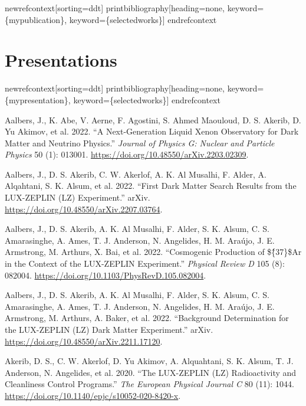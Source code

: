 \documentclass[
  10pt,
  letterpaper,
  DIV=11,
  numbers=noendperiod]{scrartcl}
\newlength{\cslhangindent}
\newlength{\cslentryspacingunit} %
\newenvironment{CSLReferences}[2] %
 {%
  \setlength{\parindent}{0pt}
  \ifodd #1
  \let\oldpar\par
  \def\par{\hangindent=\cslhangindent\oldpar}
  \fi
  \setlength{\parskip}{#2\cslentryspacingunit}
 }%
 {}
\begin{document}
newrefcontext{[}sorting=ddt{]} printbibliography{[}heading=none,
keyword=\{mypublication\}, keyword=\{selectedworks\}{]} endrefcontext

\hypertarget{fa-chart-bar-presentations}{%
\section{\texorpdfstring{
Presentations}{ Presentations}}\label{fa-chart-bar-presentations}}

newrefcontext{[}sorting=ddt{]} printbibliography{[}heading=none,
keyword=\{mypresentation\}, keyword=\{selectedworks\}{]} endrefcontext

\hypertarget{refs}{}
\begin{CSLReferences}{1}{0}
\leavevmode{}%
Aalbers, J., K. Abe, V. Aerne, F. Agostini, S. Ahmed Maouloud, D. S.
Akerib, D. Yu Akimov, et al. 2022. {``A {Next-Generation Liquid Xenon
Observatory} for {Dark Matter} and {Neutrino Physics}.''} \emph{Journal
of Physics G: Nuclear and Particle Physics} 50 (1): 013001.
\url{https://doi.org/10.48550/arXiv.2203.02309}.

\leavevmode{}%
Aalbers, J., D. S. Akerib, C. W. Akerlof, A. K. Al Musalhi, F. Alder, A.
Alqahtani, S. K. Alsum, et al. 2022. {``First {Dark Matter Search
Results} from the {LUX-ZEPLIN} ({LZ}) {Experiment}.''} {arXiv}.
\url{https://doi.org/10.48550/arXiv.2207.03764}.

\leavevmode{}%
Aalbers, J., D. S. Akerib, A. K. Al Musalhi, F. Alder, S. K. Alsum, C.
S. Amarasinghe, A. Ames, T. J. Anderson, N. Angelides, H. M. Araújo, J.
E. Armstrong, M. Arthurs, X. Bai, et al. 2022. {``Cosmogenic Production
of \$\{̂37\}\${Ar} in the Context of the {LUX-ZEPLIN} Experiment.''}
\emph{Physical Review D} 105 (8): 082004.
\url{https://doi.org/10.1103/PhysRevD.105.082004}.

\leavevmode{}%
Aalbers, J., D. S. Akerib, A. K. Al Musalhi, F. Alder, S. K. Alsum, C.
S. Amarasinghe, A. Ames, T. J. Anderson, N. Angelides, H. M. Araújo, J.
E. Armstrong, M. Arthurs, A. Baker, et al. 2022. {``Background
{Determination} for the {LUX-ZEPLIN} ({LZ}) {Dark Matter Experiment}.''}
{arXiv}. \url{https://doi.org/10.48550/arXiv.2211.17120}.

\leavevmode{}%
Akerib, D. S., C. W. Akerlof, D. Yu Akimov, A. Alquahtani, S. K. Alsum,
T. J. Anderson, N. Angelides, et al. 2020. {``The {LUX-ZEPLIN} ({LZ})
Radioactivity and Cleanliness Control Programs.''} \emph{The European
Physical Journal C} 80 (11): 1044.
\url{https://doi.org/10.1140/epjc/s10052-020-8420-x}.


\end{CSLReferences}
\end{document}
